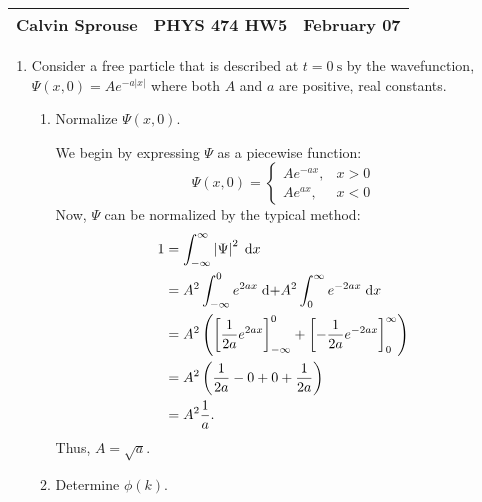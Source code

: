 \documentclass[a4paper, 12pt]{config/homework}
\begin{document}
\noindent
\begin{tabularx}{\textwidth}{>{\centering\arraybackslash}X>{\centering\arraybackslash}X>{\centering\arraybackslash}X}
Calvin Sprouse & PHYS 474 HW5 & 2024 February 07\\
\midrule
\end{tabularx}

\begin{enumerate}
\item Consider a free particle that is described at \(t=\qty{0}{\second}\) by the wavefunction, \(\Psi(x,0)=Ae^{-a|x|}\) where both \(A\) and \(a\) are positive, real constants.
\begin{enumerate}
\item Normalize \(\Psi(x,0)\).

We begin by expressing \(\Psi \) as a piecewise function:
\[\Psi(x,0) = \begin{cases}
Ae^{-ax}, & x > 0 \\ Ae^{ax}, & x < 0
\end{cases}\]
Now, \(\Psi \) can be normalized by the typical method:
\begin{align*}
1 &= \bint{-\infty}{\infty}{\left|\Psi\right|^2}{x}
\\&= A^2\bint{-\infty}{0}{e^{2ax}} + A^2\bint{0}{\infty}{e^{-2ax}}{x}
\\&= A^2\left( \left[\frac{1}{2a}e^{2ax}\right]_{-\infty}^0 + \left[-\frac{1}{2a}e^{-2ax}\right]_0^\infty \right)
\\&= A^2\left( \frac{1}{2a} - 0 + 0 + \frac{1}{2a} \right)
\\&= A^2 \frac{1}{a}.
\end{align*}
Thus, \(A=\sqrt{a}\).

\item Determine \(\phi(k)\).


\end{enumerate}
\end{enumerate}
\end{document}
